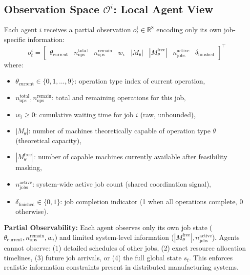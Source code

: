 \subsection{Observation Space $\mathcal{O}^i$: Local Agent View}
Each agent \( i \) receives a partial observation \( o_t^i \in \mathbb{R}^8 \) encoding only its own job-specific information:
\begin{equation}
o_t^i = \begin{bmatrix}
\theta_{\text{current}} & n_{\text{ops}}^{\text{total}} & n_{\text{ops}}^{\text{remain}} & w_i & |M_\theta| & |M_{\theta}^{\text{free}}| & n_{\text{jobs}}^{\text{active}} & \delta_{\text{finished}}
\end{bmatrix}^\top
\end{equation}
where:
\begin{itemize}
    \item \( \theta_{\text{current}} \in \{0, 1, \ldots, 9\} \): operation type index of current operation,
    \item \( n_{\text{ops}}^{\text{total}}, n_{\text{ops}}^{\text{remain}} \): total and remaining operations for this job,
    \item \( w_i \geq 0 \): cumulative waiting time for job \( i \) (raw, unbounded),
    \item \( |M_\theta| \): number of machines theoretically capable of operation type \( \theta \) (theoretical capacity),
    \item \( |M_{\theta}^{\text{free}}| \): number of capable machines currently available after feasibility masking,
    \item \( n_{\text{jobs}}^{\text{active}} \): system-wide active job count (shared coordination signal),
    \item \( \delta_{\text{finished}} \in \{0,1\} \): job completion indicator (1 when all operations complete, 0 otherwise).
\end{itemize}

\textbf{Partial Observability:} Each agent observes only its own job state (\( \theta_{\text{current}}, n_{\text{ops}}^{\text{remain}}, w_i \)) and limited system-level information (\( |M_{\theta}^{\text{free}}|, n_{\text{jobs}}^{\text{active}} \)). Agents cannot observe: (1) detailed schedules of other jobs, (2) exact resource allocation timelines, (3) future job arrivals, or (4) the full global state \( s_t \). This enforces realistic information constraints present in distributed manufacturing systems.


